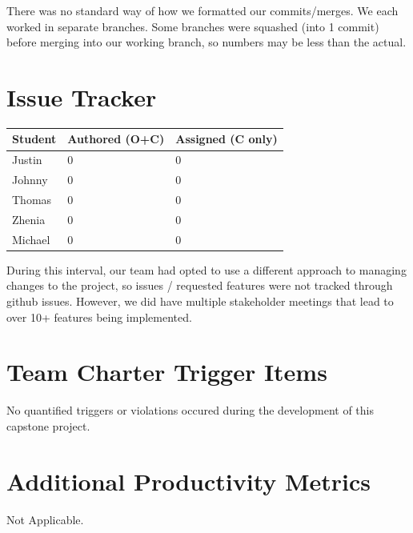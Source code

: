 \documentclass{article}
\begin{document}
There was no standard way of how we formatted our commits/merges. We each worked in separate branches. Some branches were squashed (into 1 commit) before merging into our working branch, so numbers may be less than the actual.

\section{Issue Tracker}

\begin{table}[H]
\centering
\begin{tabular}{lll}
\toprule
\textbf{Student} & \textbf{Authored (O+C)} & \textbf{Assigned (C only)}\\
\midrule
Justin & 0 & 0 \\
Johnny & 0 & 0 \\
Thomas & 0 & 0 \\
Zhenia & 0 & 0 \\
Michael & 0 & 0 \\
\bottomrule
\end{tabular}
\end{table}

During this interval, our team had opted to use a different approach to managing changes to the project, so issues / requested features were not tracked through github issues. However, we did have multiple stakeholder meetings that lead to over 10+ features being implemented.

\section{Team Charter Trigger Items}

No quantified triggers or violations occured during the development of this capstone project.

\section{Additional Productivity Metrics}

Not Applicable.
\end{document}
